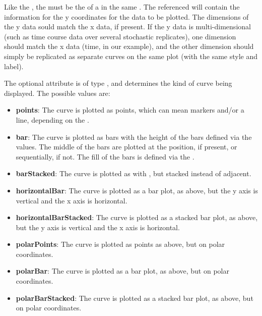 \begin{blockChanged}
Like the , the  must be the  of a \DataGenerator in the same \SedDocument.  The referenced \DataGenerator will contain the information for the y coordinates for the data to be plotted.  The dimensions of the y data sould match the x data, if present.  If the y data is multi-dimensional (such as time course data over several stochastic replicates), one dimension should match the x data (time, in our example), and the other dimension should simply be replicated as separate curves on the same plot (with the same style and label).

The optional  attribute is of type \CurveKind, and determines the kind of curve being displayed.  The possible values are:

\begin{itemize}
\item \textbf{points}: The curve is plotted as points, which can mean markers and/or a line, depending on the .
\item \textbf{bar}: The curve is plotted as bars with the height of the bars defined via the  values.  The middle of the bars are plotted at the  position, if present, or sequentially, if not.  The fill of the bars is defined via the . 
\item \textbf{barStacked}: The curve is plotted as with , but stacked instead of adjacent.
\item \textbf{horizontalBar}: The curve is plotted as a bar plot, as above, but the y axis is vertical and the x axis is horizontal.
\item \textbf{horizontalBarStacked}: The curve is plotted as a stacked bar plot, as above, but the y axis is vertical and the x axis is horizontal.
\item \textbf{polarPoints}: The curve is plotted as points as above, but on polar coordinates.
\item \textbf{polarBar}: The curve is plotted as a bar plot, as above, but on polar coordinates.
\item \textbf{polarBarStacked}: The curve is plotted as a stacked bar plot, as above, but on polar coordinates.
\end{itemize}


\end{blockChanged}
